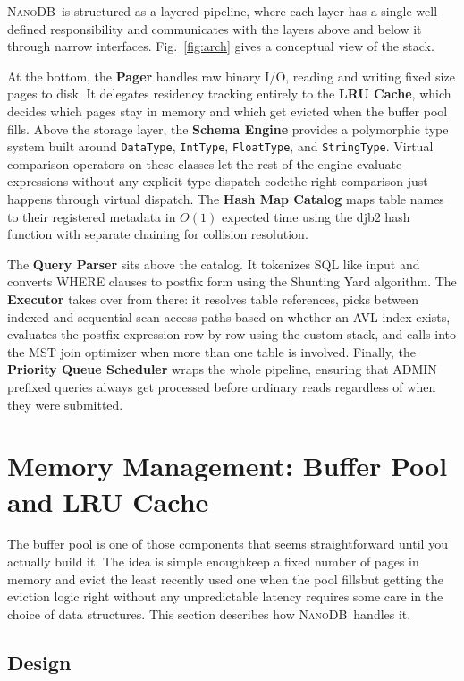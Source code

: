 \documentclass[conference]{IEEEtran}
\newcommand{\NanoDB}{\textsc{NanoDB}}
\newcommand{\code}[1]{\texttt{#1}}
\begin{document}
\NanoDB\ is structured as a layered pipeline, where each layer has a single
well defined responsibility and communicates with the layers above and below it
through narrow interfaces. Fig.~\ref{fig:arch} gives a conceptual view of the
stack.

At the bottom, the \textbf{Pager} handles raw binary I/O, reading and writing
fixed size pages to disk. It delegates residency tracking entirely to the
\textbf{LRU Cache}, which decides which pages stay in memory and which get
evicted when the buffer pool fills. Above the storage layer, the \textbf{Schema
Engine} provides a polymorphic type system built around \code{DataType},
\code{IntType}, \code{FloatType}, and \code{StringType}. Virtual comparison
operators on these classes let the rest of the engine evaluate expressions without
any explicit type dispatch codethe right comparison just happens through
virtual dispatch. The \textbf{Hash Map Catalog} maps table names to their
registered metadata in $O(1)$ expected time using the djb2 hash function with
separate chaining for collision resolution.

The \textbf{Query Parser} sits above the catalog. It tokenizes SQL like input and
converts WHERE clauses to postfix form using the Shunting Yard algorithm. The
\textbf{Executor} takes over from there: it resolves table references, picks
between indexed and sequential scan access paths based on whether an AVL index
exists, evaluates the postfix expression row by row using the custom stack, and
calls into the MST join optimizer when more than one table is involved. Finally,
the \textbf{Priority Queue Scheduler} wraps the whole pipeline, ensuring that
ADMIN prefixed queries always get processed before ordinary reads regardless of
when they were submitted.

\section{Memory Management: Buffer Pool and LRU Cache}

The buffer pool is one of those components that seems straightforward until you
actually build it. The idea is simple enoughkeep a fixed number of pages in
memory and evict the least recently used one when the pool fillsbut getting the
eviction logic right without any unpredictable latency requires some care in the
choice of data structures. This section describes how \NanoDB\ handles it.

\subsection{Design}
\end{document}
